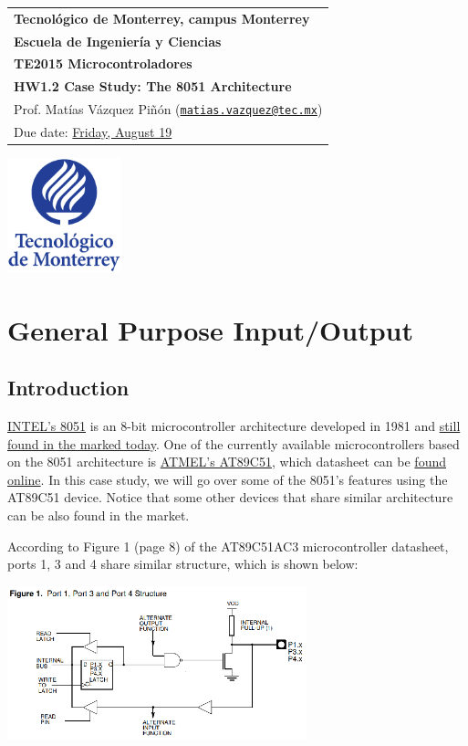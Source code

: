 \documentclass[10pt, letterpaper]{article}
\makeatletter
\def\tecdemty{Tecnol\'ogico de Monterrey, campus Monterrey}
\def\school{Escuela de Ingenier\'ia y Ciencias}
\def\me{Prof. Mat\'ias V\'azquez Pi\~n\'on (\href{mailto:matias.vazquez@tec.mx}{\texttt{matias.vazquez@tec.mx}})}
\def\course{TE2015 Microcontroladores}
\def\doctitle{HW1.2 Case Study: The 8051 Architecture}
\makeatother
\begin{document}
\noindent
	\begin{tabular}[b]{@{}l@{}}
	{\bfseries\Large\tecdemty}\\ [1mm]
	{\bfseries\large\school}\\ [5mm]
	{\bfseries\large\course}\\ [1mm]
	{\bfseries\large{\doctitle}}\\ [1mm]
	{\large\me} \\ [1mm]
	{\large Due date: \href{https://experiencia21.tec.mx/courses/286463/assignments/9678285}{Friday, August 19}} \\ [1mm] 

\end{tabular}	\hfill
\includegraphics[height=1.3in]{img/logoTec.eps}

\section*{General Purpose Input/Output}
\subsection*{Introduction}
\href{https://en.wikipedia.org/wiki/Intel_8051}{INTEL’s 8051} is an 8-bit microcontroller architecture developed in 1981 and \href{https://www.digikey.com.mx/es/products/filter/integrados-microcontroladores/685?s=N4IgjCBcoKwAwDYqgMZQGYEMA2BnApgDQgD2UA2iAEwAcCAnFXCALrEAOALlCAMqcAnAJYA7AOYgAvtKA}{still found in the marked today}. One of the currently available microcontrollers based on the 8051 architecture is \href{https://en.wikipedia.org/wiki/Atmel_AT89_series}{ATMEL’s AT89C51}, which datasheet can be \href{http://ww1.microchip.com/downloads/en/devicedoc/doc4383.pdf}{found online}. In this case study, we will go over some of the 8051’s features using the AT89C51 device. Notice that some other devices that share similar architecture can be also found in the market. 

According to Figure 1 (page 8) of the AT89C51AC3 microcontroller datasheet, ports 1, 3 and 4 share similar structure, which is shown below:

\begin{center}
\includegraphics[width=0.65\textwidth]{img/fig01.eps}
\end{center}
\end{document}
